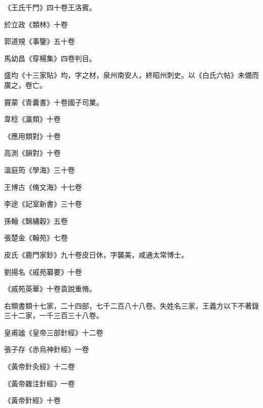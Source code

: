 \begin{pinyinscope}
 《王氏千門》四十卷王洛賓。



 於立政《類林》十卷



 郭道規《事鑒》五十卷



 馬幼昌《穿楊集》四卷判目。



 盛均《十三家貼》均，字之材，泉州南安人，終昭州刺史。以《白氏六帖》未備而廣之，卷亡。



 竇蒙《青囊書》十卷國子司業。



 韋稔《瀛類》十卷



 《應用類對》十卷



 高測《韻對》十卷



 溫庭筠《學海》三十卷



 王博古《脩文海》十七卷



 李途《記室新書》三十卷



 孫翰《錦繡穀》五卷



 張楚金《翰苑》七卷



 皮氏《鹿門家鈔》九十卷皮日休，字襲美，咸通太常博士。



 劉揚名《戚苑纂要》十卷



 《戚苑英華》十卷袁說重脩。



 右類書類十七家，二十四部，七千二百八十八卷。失姓名三家，王義方以下不著錄三十二家，一千三百三十八卷。



 皇甫謐《皇帝三部針經》十二卷



 張子存《赤烏神針經》一卷



 《黃帝針灸經》十二卷



 《黃帝雜注針經》一卷



 《黃帝針經》十卷




\end{pinyinscope}
